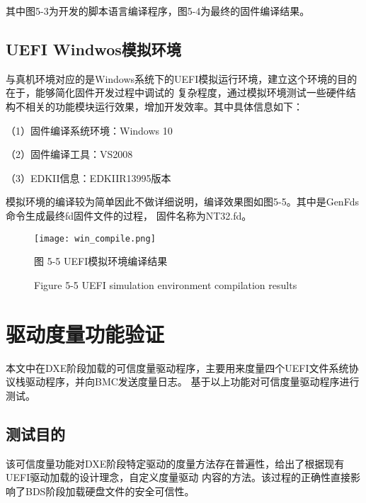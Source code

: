 其中图5-3为开发的脚本语言编译程序，图5-4为最终的固件编译结果。

\subsection{UEFI Windwos模拟环境}
与真机环境对应的是Windows系统下的UEFI模拟运行环境，建立这个环境的目的在于，能够简化固件开发过程中调试的
复杂程度，通过模拟环境测试一些硬件结构不相关的功能模块运行效果，增加开发效率。其中具体信息如下：
\par （1）固件编译系统环境：Windows 10
\par （2）固件编译工具：VS2008
\par （3）EDKII信息：EDKIIR13995版本
\par 模拟环境的编译较为简单因此不做详细说明，编译效果图如图5-5。其中是GenFds命令生成最终fd固件文件的过程，
固件名称为NT32.fd。

\begin{figure}[htb]
    \label{ffs_format}
    \vspace{0cm}   
    \setlength{\abovecaptionskip}{0.3cm}
	\centering
    \texttt{[image: win\_compile.png]}
    \caption*{图 5-5 UEFI模拟环境编译结果}
    \setlength{\belowcaptionskip}{-0.7cm}
    \caption*{Figure 5-5 UEFI simulation environment compilation results}
\end{figure}

%
%
\section{驱动度量功能验证}
本文中在DXE阶段加载的可信度量驱动程序，主要用来度量四个UEFI文件系统协议栈驱动程序，并向BMC发送度量日志。
基于以上功能对可信度量驱动程序进行测试。

\subsection{测试目的}
该可信度量功能对DXE阶段特定驱动的度量方法存在普遍性，给出了根据现有UEFI驱动加载的设计理念，自定义度量驱动
内容的方法。该过程的正确性直接影响了BDS阶段加载硬盘文件的安全可信性。

